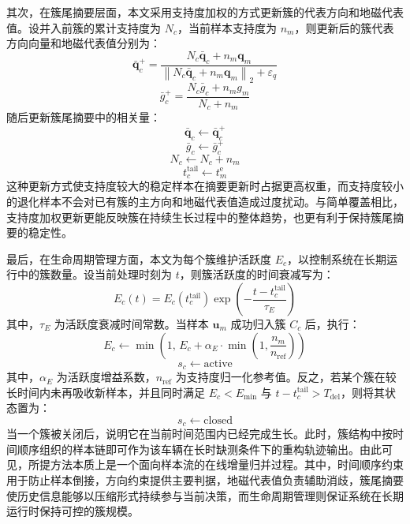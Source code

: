 \documentclass{xdupgthesis}
\begin{document}
其次，在簇尾摘要层面，本文采用支持度加权的方式更新簇的代表方向和地磁代表值。设并入前簇的累计支持度为 $N_c$，当前样本支持度为 $n_m$，则更新后的簇代表方向向量和地磁代表值分别为：
\begin{equation}
	\bar{\mathbf{q}}_c^{+}=
	\frac{
		N_c\bar{\mathbf{q}}_c+n_m\mathbf{q}_m
	}{
		\left\|
		N_c\bar{\mathbf{q}}_c+n_m\mathbf{q}_m
		\right\|_2+\varepsilon_q
	}
\end{equation}
\begin{equation}
	\bar{g}_c^{+}=
	\frac{N_c\bar{g}_c+n_m g_m}{N_c+n_m}
\end{equation}
随后更新簇尾摘要中的相关量：
\begin{equation}
	\bar{\mathbf{q}}_c\leftarrow \bar{\mathbf{q}}_c^{+}
\end{equation}
\begin{equation}
	\bar{g}_c\leftarrow \bar{g}_c^{+}
\end{equation}
\begin{equation}
	N_c\leftarrow N_c+n_m
\end{equation}
\begin{equation}
	t_c^{\mathrm{tail}}\leftarrow t_m^{\mathrm{e}}
\end{equation}
这种更新方式使支持度较大的稳定样本在摘要更新时占据更高权重，而支持度较小的退化样本不会对已有簇的主方向和地磁代表值造成过度扰动。与简单覆盖相比，支持度加权更新更能反映簇在持续生长过程中的整体趋势，也更有利于保持簇尾摘要的稳定性。

最后，在生命周期管理方面，本文为每个簇维护活跃度 $E_c$，以控制系统在长期运行中的簇数量。设当前处理时刻为 $t$，则簇活跃度的时间衰减写为：
\begin{equation}
	E_c(t)=E_c(t_c^{\mathrm{tail}})
	\exp
	\left(
	-\frac{t-t_c^{\mathrm{tail}}}{\tau_E}
	\right)
\end{equation}
其中，$\tau_E$ 为活跃度衰减时间常数。当样本 $\mathbf{u}_m$ 成功归入簇 $C_c$ 后，执行：
\begin{equation}
	E_c\leftarrow
	\min
	\left(
	1,\,
	E_c+\alpha_E\cdot \min\left(1,\frac{n_m}{n_{\mathrm{ref}}}\right)
	\right)
\end{equation}
\begin{equation}
	s_c\leftarrow \mathrm{active}
\end{equation}
其中，$\alpha_E$ 为活跃度增益系数，$n_{\mathrm{ref}}$ 为支持度归一化参考值。反之，若某个簇在较长时间内未再吸收新样本，并且同时满足 $E_c<E_{\min}$ 与 $t-t_c^{\mathrm{tail}}>T_{\mathrm{del}}$，则将其状态置为：
\begin{equation}
	s_c\leftarrow \mathrm{closed}
\end{equation}
当一个簇被关闭后，说明它在当前时间范围内已经完成生长。此时，簇结构中按时间顺序组织的样本链即可作为该车辆在长时缺测条件下的重构轨迹输出。由此可见，所提方法本质上是一个面向样本流的在线增量归并过程。其中，时间顺序约束用于防止样本倒接，方向约束提供主要判据，地磁代表值负责辅助消歧，簇尾摘要使历史信息能够以压缩形式持续参与当前决策，而生命周期管理则保证系统在长期运行时保持可控的簇规模。
\end{document}
